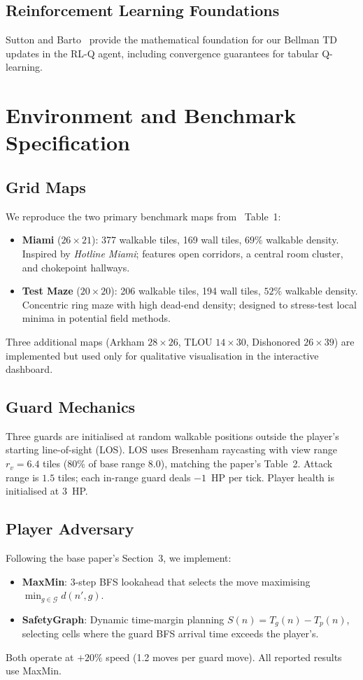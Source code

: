 \documentclass[conference,onecolumn]{IEEEtran}
\begin{document}
\subsection{Reinforcement Learning Foundations}
Sutton and Barto~\cite{sutton2018} provide the mathematical
foundation for our Bellman TD updates in the RL-Q agent, including
convergence guarantees for tabular Q-learning.

\section{Environment and Benchmark Specification}

\subsection{Grid Maps}
We reproduce the two primary benchmark maps from~\cite{xu2025}
Table~1:
\begin{itemize}
  \item \textbf{Miami} ($26\times21$): 377 walkable tiles, 169 wall
        tiles, $69\%$ walkable density. Inspired by
        \emph{Hotline Miami}; features open corridors, a central
        room cluster, and chokepoint hallways.
  \item \textbf{Test Maze} ($20\times20$): 206 walkable tiles, 194
        wall tiles, $52\%$ walkable density. Concentric ring maze
        with high dead-end density; designed to stress-test local
        minima in potential field methods.
\end{itemize}
Three additional maps (Arkham $28\times26$, TLOU $14\times30$,
Dishonored $26\times39$) are implemented but used only for
qualitative visualisation in the interactive dashboard.

\subsection{Guard Mechanics}
Three guards are initialised at random walkable positions outside the
player's starting line-of-sight (LOS). LOS uses Bresenham
raycasting with view range $r_v = 6.4$ tiles (80\% of base range
$8.0$), matching the paper's Table~2. Attack range is $1.5$ tiles;
each in-range guard deals $-1$~HP per tick. Player health is
initialised at $3$~HP.

\subsection{Player Adversary}
Following the base paper's Section~3, we implement:
\begin{itemize}
  \item \textbf{MaxMin}: 3-step BFS lookahead that selects the move
        maximising $\min_{g \in \mathcal{G}} d(n', g)$.
  \item \textbf{SafetyGraph}: Dynamic time-margin planning
        $S(n) = T_g(n) - T_p(n)$, selecting cells where the guard
        BFS arrival time exceeds the player's.
\end{itemize}
Both operate at $+20\%$ speed (1.2 moves per guard move).
All reported results use MaxMin.
\end{document}
